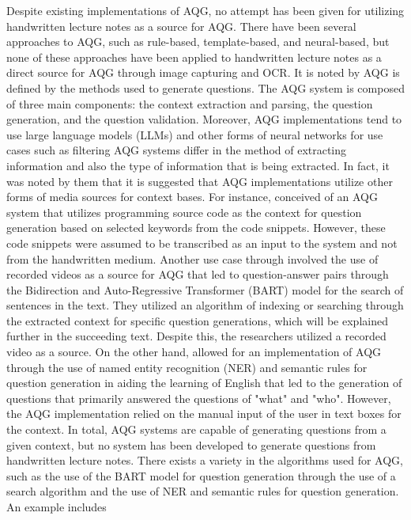 \documentclass[conference]{IEEEtran}
\begin{document}
Despite existing implementations of AQG, no attempt has been given for utilizing 
handwritten lecture notes as a source for AQG. There have been several
approaches to AQG, such as rule-based, template-based, and neural-based,
but none of these approaches have been applied to handwritten lecture notes as 
a direct source for AQG through image capturing and OCR. It is noted by \cite{Arbaaeen2020}
AQG is defined by the methods used to generate questions.
The AQG system is composed of three main components: the context extraction and
parsing, the question generation, and the question validation. 
Moreover, AQG implementations tend to use large language models (LLMs) 
and other forms of neural networks for use cases such as 
filtering \cite{Fernandez2023} AQG systems differ in the method of extracting information and also 
the type of information that is being extracted. In fact, it was noted by them 
that it is suggested that AQG implementations utilize other forms of media 
sources for context bases. For instance, \cite{Gaur2023} conceived 
of an AQG system that utilizes programming source code as the context for question
generation based on selected keywords from the code snippets. However, these 
code snippets were assumed to be transcribed as an input to the system and not 
from the handwritten medium. Another use case
through \cite{Ou2022} involved the use of recorded videos as a source for AQG 
that led to question-answer pairs through the 
Bidirection and Auto-Regressive Transformer (BART) model for
the search of sentences in the text. They utilized an algorithm of indexing or 
searching through the extracted context for specific question generations, which 
will be explained further in the succeeding text. Despite this, the researchers utilized 
a recorded video as a source. On the other hand, \cite{Moron2021}
allowed for an implementation of AQG through the use of named entity recognition 
(NER) and semantic rules for question generation in aiding the learning of 
English that led to the generation of questions that primarily answered the
questions of "what" and "who". However, the AQG implementation relied on the 
manual input of the user in text boxes for the context. In total, AQG systems 
are capable of generating questions from a given context, but no system has been
developed to generate questions from handwritten lecture notes.
There exists a variety in the algorithms used for AQG, such as the use of 
the BART model for question generation through the use of a search algorithm and 
the use of NER and semantic rules for question generation. An example includes 
\end{document}

